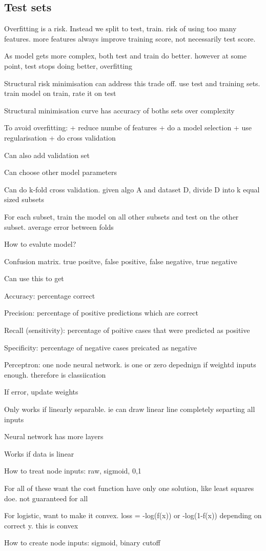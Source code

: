 
\subsection{Test sets}

Overfitting is a risk. Instead we split to test, train. risk of using too many features. more features always improve training score, not necessarily test score.

As model gets more complex, both test and train do better. however at some point, test stops doing better, overfitting

Structural risk minimisation can address this trade off. use test and training sets. train model on train, rate it on test

Structural minimisation curve has accuracy of boths sets over complexity

To avoid overfitting:
+ reduce numbe of features
+ do a model selection
+ use regularisation
+ do cross validation 

Can also add validation set

Can choose other model parameters

Can do k-fold cross validation. given algo A and dataset D, divide D into k equal sized subsets

For each subset, train the model on all other subsets and test on the other subset. average error between folds

How to evalute model?

Confusion matrix. true positve, false positive, false negative, true negative

Can use this to get

Accuracy: percentage correct

Precision: percentage of positive predictions which are correct

Recall (sensitivity): percentage of poitive cases that were predicted as positive

Specificity: percentage of negative cases preicated as negative 

Perceptron: one node neural network. is one or zero depednign if weightd inputs enough. therefore is classiication

If error, update weights

Only works if linearly separable. ie can draw linear line completely separting all inputs

Neural network has more layers

Works if data is linear

How to treat node inputs: raw, sigmoid, {0,1}

For all of these want the cost function have only one solution, like least squares doe. not guaranteed for all

For logistic, want to make it convex. loss = -log(f(x)) or -log(1-f(x)) depending on correct y. this is convex

How to create node inputs: sigmoid, binary cutoff

